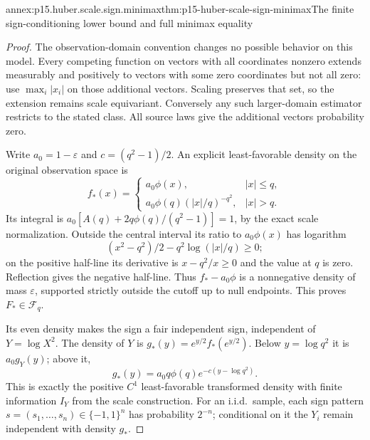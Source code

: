 \begin{annexitem}{annex:p15.huber.scale.sign.minimax}{thm:p15-huber-scale-sign-minimax}{The finite sign-conditioning lower bound and full minimax equality}
\begin{proof}
The observation-domain convention changes no possible behavior
on this model. Every competing function on vectors with all
coordinates nonzero extends measurably and positively to vectors
with some zero coordinates but not all zero: use
\(\max_i|x_i|\) on those additional vectors. Scaling preserves
that set, so the extension remains scale equivariant.
Conversely any such larger-domain estimator restricts to the stated
class. All source laws give the additional vectors probability zero.

Write \(a_0=1-\varepsilon\) and \(c=(q^2-1)/2\).
An explicit least-favorable density on the original observation
space is
\[
 f_*(x)=
 \begin{cases}
 a_0\phi(x),&|x|\leq q,\\
 a_0\phi(q)(|x|/q)^{-q^2},&|x|>q.
 \end{cases}
\]
Its integral is
\(a_0[A(q)+2q\phi(q)/(q^2-1)]=1\), by the exact scale
normalization. Outside the central interval its ratio to
\(a_0\phi(x)\) has logarithm
\[
       (x^2-q^2)/2-q^2\log(|x|/q)\geq0;
\]
on the positive half-line its derivative is \(x-q^2/x\geq0\)
and the value at \(q\) is zero. Reflection gives the negative
half-line. Thus \(f_*-a_0\phi\) is a nonnegative density of
mass \(\varepsilon\), supported strictly outside the cutoff
up to null endpoints. This proves \(F_*\in\mathcal F_q\).

Its even density makes the sign a fair independent sign,
independent of \(Y=\log X^2\). The density of \(Y\) is
\(g_*(y)=e^{y/2}f_*(e^{y/2})\).
Below \(y=\log q^2\) it is \(a_0g_Y(y)\); above it,
\[
                 g_*(y)=a_0q\phi(q)e^{-c(y-\log q^2)}.
\]
This is exactly the positive \(C^1\) least-favorable transformed
density with finite information \(I_Y\) from the scale construction.
For an i.i.d.\ sample, each sign pattern
\(s=(s_1,\ldots,s_n)\in\{-1,1\}^n\) has probability \(2^{-n}\);
conditional on it the \(Y_i\) remain independent with density \(g_*\).


\end{proof}
\end{annexitem}
